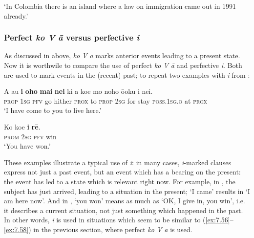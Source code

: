 \glt 
‘In Colombia there is an island where a law on immigration came out in 1991 already.’ \textstyleExampleref{[R649.231]} 
\z

\subsubsection[Perfect ko V {\ꞌ}ā versus perfective i]{Perfect \textit{ko V {\ꞌ}ā} versus perfective \textit{i}}\label{sec:7.2.7.4}

As discussed in  above, \textit{ko V {\ꞌ}ā} marks anterior events leading to a present state. Now it is worthwile to compare the use of perfect \textit{ko V {\ꞌ}ā} and perfective \textit{i}. Both are used to mark events in the (recent) past; to repeat two examples with \textit{i} from :


\ea\label{ex:7.74}
\gll A au \textbf{i} \textbf{oho} \textbf{mai} \textbf{nei} ki a koe mo noho ō{\ꞌ}oku {\ꞌ}i nei. \\
\textsc{prop} \textsc{1sg} \textsc{pfv} go hither \textsc{prox} to \textsc{prop} \textsc{2sg} for stay \textsc{poss.1sg.o} at \textsc{prox} \\

\glt 
‘I have come to you to live here.’ \textstyleExampleref{[R245.072]} 
\z

\ea\label{ex:7.75}
\gll Ko koe \textbf{i} \textbf{rē}. \\
\textsc{prom} \textsc{2sg} \textsc{pfv} win \\

\glt
‘You have won.’ \textstyleExampleref{[R210.071]} 
\z

These examples illustrate a typical use of \textit{i}: in many cases, \textit{i}{}-marked clauses express not just a past event, but an event which has a bearing on the present: the event has led to a state which is relevant right now. For example, in , the subject has just arrived, leading to a situation in the present; ‘I came’ results in ‘I am here now’. And in , ‘you won’ means as much as ‘OK, I give in, you win’, i.e. it describes a current situation, not just something which happened in the past. In other words, \textit{i} is used in situations which seem to be similar to (\ref{ex:7.56}–\ref{ex:7.58}) in the previous section, where perfect  \textit{ko V {\ꞌ}ā} is used. 

